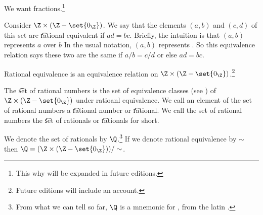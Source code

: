 

We want fractions.\footnote{This why will be expanded in future editions.}


Consider $\Z \times (\Z - \set{0_{\Z}})$.
We say that the elements $(a, b)$ and $(c, d)$ of this set are \t{rational equivalent} if $ad = bc$.
Brieﬂy, the intuition is that $(a, b)$ represents $a$ over $b$
In the usual notation, $(a, b)$ represents .
So this equivalence relation says these two are the same if $a/b = c/d$ or else $ad= bc$.


\begin{proposition}
  Rational equivalence is an equivalence relation on $\Z \times (\Z - \set{0_{\Z}})$.\footnote{Future editions will include an account.}
\end{proposition}


The \t{set of rational numbers} is the set of equivalence classes (see ) of $\Z \times (\Z - \set{0_{\Z}})$ under ratioanl equivalence.
We call an element of the set of rational numbers a \t{rational number} or \t{rational}.
We call the set of rational numbers the \t{set of rationals} or \t{rationals} for short.


We denote the set of rationals by $\Q$.\footnote{From what we can tell so far, $\Q$ is a mnemonic for , from the latin .}
If we denote rational equivalence by $\sim$ then $\Q = (\Z \times (\Z - \set{0_{\Z}}))/\sim$.


\blankpage
